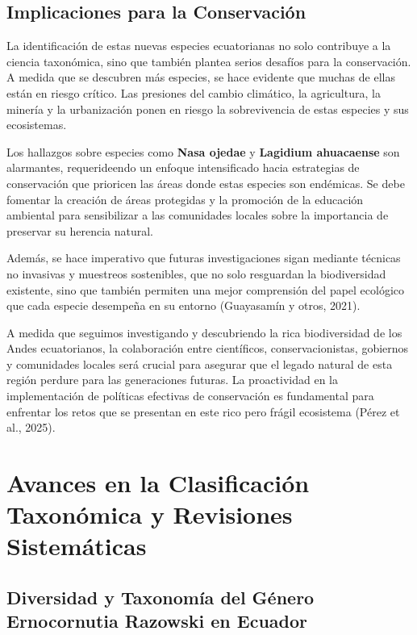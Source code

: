 \documentclass[
  letterpaper,
  DIV=11,
  numbers=noendperiod,
  oneside]{scrreprt}
\begin{document}
\section{Implicaciones para la
Conservación}\label{implicaciones-para-la-conservaciuxf3n}

La identificación de estas nuevas especies ecuatorianas no solo
contribuye a la ciencia taxonómica, sino que también plantea serios
desafíos para la conservación. A medida que se descubren más especies,
se hace evidente que muchas de ellas están en riesgo crítico. Las
presiones del cambio climático, la agricultura, la minería y la
urbanización ponen en riesgo la sobrevivencia de estas especies y sus
ecosistemas.

Los hallazgos sobre especies como \textbf{Nasa ojedae} y
\textbf{Lagidium ahuacaense} son alarmantes, requerideendo un enfoque
intensificado hacia estrategias de conservación que prioricen las áreas
donde estas especies son endémicas. Se debe fomentar la creación de
áreas protegidas y la promoción de la educación ambiental para
sensibilizar a las comunidades locales sobre la importancia de preservar
su herencia natural.

Además, se hace imperativo que futuras investigaciones sigan mediante
técnicas no invasivas y muestreos sostenibles, que no solo resguardan la
biodiversidad existente, sino que también permiten una mejor comprensión
del papel ecológico que cada especie desempeña en su entorno (Guayasamín
y otros, 2021).

A medida que seguimos investigando y descubriendo la rica biodiversidad
de los Andes ecuatorianos, la colaboración entre científicos,
conservacionistas, gobiernos y comunidades locales será crucial para
asegurar que el legado natural de esta región perdure para las
generaciones futuras. La proactividad en la implementación de políticas
efectivas de conservación es fundamental para enfrentar los retos que se
presentan en este rico pero frágil ecosistema (Pérez et al., 2025).

\chapter{Avances en la Clasificación Taxonómica y Revisiones
Sistemáticas}\label{avances-en-la-clasificaciuxf3n-taxonuxf3mica-y-revisiones-sistemuxe1ticas}

\section{Diversidad y Taxonomía del Género Ernocornutia Razowski en
Ecuador}\label{diversidad-y-taxonomuxeda-del-guxe9nero-ernocornutia-razowski-en-ecuador}
\end{document}
